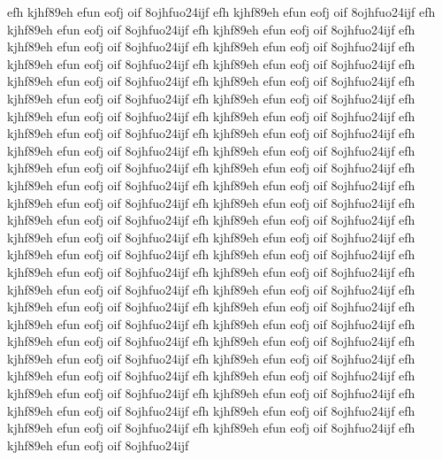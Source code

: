 \documentclass[a4paper,12pt]{book} %
\begin{document}
efh kjhf89eh efun eofj oif 8ojhfuo24ijf
efh kjhf89eh efun eofj oif 8ojhfuo24ijf
efh kjhf89eh efun eofj oif 8ojhfuo24ijf
efh kjhf89eh efun eofj oif 8ojhfuo24ijf
efh kjhf89eh efun eofj oif 8ojhfuo24ijf
efh kjhf89eh efun eofj oif 8ojhfuo24ijf
efh kjhf89eh efun eofj oif 8ojhfuo24ijf
efh kjhf89eh efun eofj oif 8ojhfuo24ijf
efh kjhf89eh efun eofj oif 8ojhfuo24ijf
efh kjhf89eh efun eofj oif 8ojhfuo24ijf
efh kjhf89eh efun eofj oif 8ojhfuo24ijf
efh kjhf89eh efun eofj oif 8ojhfuo24ijf
efh kjhf89eh efun eofj oif 8ojhfuo24ijf
efh kjhf89eh efun eofj oif 8ojhfuo24ijf
efh kjhf89eh efun eofj oif 8ojhfuo24ijf
efh kjhf89eh efun eofj oif 8ojhfuo24ijf
efh kjhf89eh efun eofj oif 8ojhfuo24ijf
efh kjhf89eh efun eofj oif 8ojhfuo24ijf
efh kjhf89eh efun eofj oif 8ojhfuo24ijf
efh kjhf89eh efun eofj oif 8ojhfuo24ijf
efh kjhf89eh efun eofj oif 8ojhfuo24ijf
efh kjhf89eh efun eofj oif 8ojhfuo24ijf
efh kjhf89eh efun eofj oif 8ojhfuo24ijf
efh kjhf89eh efun eofj oif 8ojhfuo24ijf
efh kjhf89eh efun eofj oif 8ojhfuo24ijf
efh kjhf89eh efun eofj oif 8ojhfuo24ijf
efh kjhf89eh efun eofj oif 8ojhfuo24ijf
efh kjhf89eh efun eofj oif 8ojhfuo24ijf
efh kjhf89eh efun eofj oif 8ojhfuo24ijf
efh kjhf89eh efun eofj oif 8ojhfuo24ijf
efh kjhf89eh efun eofj oif 8ojhfuo24ijf
efh kjhf89eh efun eofj oif 8ojhfuo24ijf
efh kjhf89eh efun eofj oif 8ojhfuo24ijf
efh kjhf89eh efun eofj oif 8ojhfuo24ijf
efh kjhf89eh efun eofj oif 8ojhfuo24ijf
efh kjhf89eh efun eofj oif 8ojhfuo24ijf
efh kjhf89eh efun eofj oif 8ojhfuo24ijf
efh kjhf89eh efun eofj oif 8ojhfuo24ijf
efh kjhf89eh efun eofj oif 8ojhfuo24ijf
efh kjhf89eh efun eofj oif 8ojhfuo24ijf
efh kjhf89eh efun eofj oif 8ojhfuo24ijf
efh kjhf89eh efun eofj oif 8ojhfuo24ijf
efh kjhf89eh efun eofj oif 8ojhfuo24ijf
efh kjhf89eh efun eofj oif 8ojhfuo24ijf
efh kjhf89eh efun eofj oif 8ojhfuo24ijf
efh kjhf89eh efun eofj oif 8ojhfuo24ijf
efh kjhf89eh efun eofj oif 8ojhfuo24ijf
efh kjhf89eh efun eofj oif 8ojhfuo24ijf
efh kjhf89eh efun eofj oif 8ojhfuo24ijf
efh kjhf89eh efun eofj oif 8ojhfuo24ijf
efh kjhf89eh efun eofj oif 8ojhfuo24ijf
\end{document}
